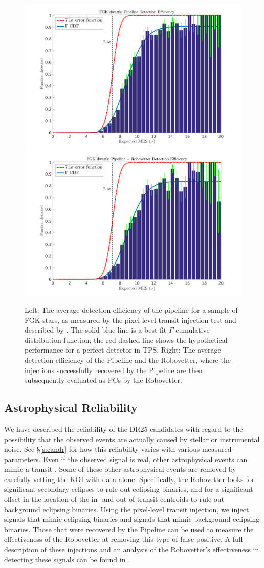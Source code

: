 \begin{figure}[ht]

\centering

\includegraphics[width=0.45\linewidth]{fig-senscurvwithfits_withoutRv.png}
\includegraphics[width=0.45\linewidth]{fig-senscurvwithfits_withRv.png}

\caption{Left: The average detection efficiency of the pipeline for a sample of FGK stars, as measured by the pixel-level transit injection test and described by \citet{Christiansen2017}. The solid blue line is a best-fit $\Gamma$ cumulative distribution function; the red dashed line shows the hypothetical performance for a perfect detector in TPS. Right: The average detection efficiency of the \Kepler{} Pipeline and the Robovetter, where the injections successfully recovered by the Pipeline are then subsequently evaluated as PCs by the Robovetter.}

\label{f:fulldetectionefficiency}

\end{figure}


\subsection{Astrophysical Reliability}
We have described the reliability of the DR25 candidates with regard to the possibility that the observed events are actually caused by stellar or instrumental noise. See \S\ref{s:candr} for how this reliability varies with various measured parameters.  Even if the observed signal is real, other astrophysical events can mimic a transit \citep[see e.g.][]{Morton2016}. Some of these other astrophysical events are removed by carefully vetting the KOI with \Kepler{} data alone.  Specifically, the Robovetter looks for significant secondary eclipses to rule out eclipsing binaries, and for a significant offset in the location of the in- and out-of-transit centroids to rule out background eclipsing binaries. Using the pixel-level transit injection, we inject signals that mimic eclipsing binaries and signals that mimic background eclipsing binaries. Those that were recovered by the \Kepler{} Pipeline can be used to measure the effectiveness of the Robovetter at removing this type of false positive. A full description of these injections and an analysis of the Robovetter's effectiveness in detecting these signals can be found in \citet{Coughlin2017a}.

